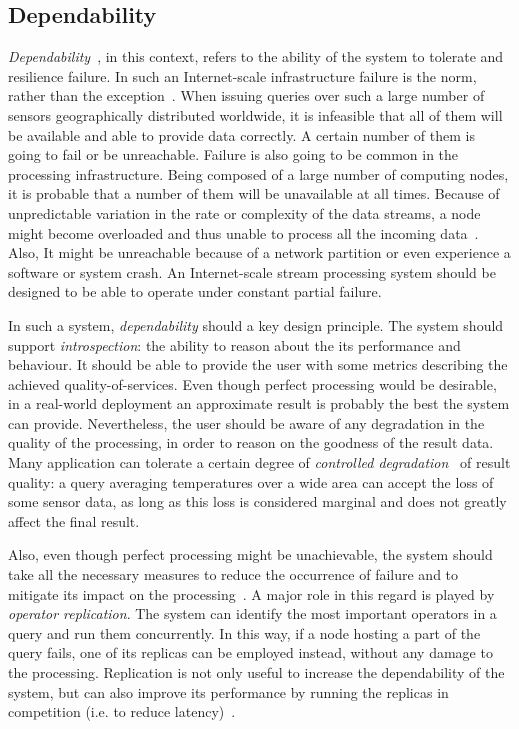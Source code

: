 \subsection{Dependability}
\emph{Dependability}~\cite{dependability}, in this context, refers to the ability of the system to tolerate and resilience failure.
In such an Internet-scale infrastructure failure is the norm, rather than the exception~\cite{correlated-failures,
failure-analysis}. When issuing queries over such a large number of sensors geographically distributed worldwide, it is infeasible that all of them will be available and
able to provide data correctly. A certain number of them is going to fail or be unreachable. Failure is also going to be
common in the processing infrastructure. Being composed of a large number of computing nodes, it is probable that a
number of them will be unavailable at all times. Because of unpredictable variation in the rate or complexity of the
data streams, a node might become overloaded and thus unable to process all the incoming data~\cite{dist-net-mon}. Also, It might be
unreachable because of a network partition or even experience a software or system crash. An Internet-scale 
stream processing system should be designed to be able to operate under constant partial failure. 

In such a system, \textit{dependability} should a key design principle. The system should support \emph{introspection}:
the ability to reason about the its performance and behaviour. It should be able to provide the user with some metrics
describing the achieved quality-of-services. Even though perfect processing would be desirable, in a real-world deployment an approximate result is
probably the best the system can provide. Nevertheless, the user should be aware of any degradation in the quality of
the processing, in order to reason on the goodness of the result data. Many application can tolerate a certain degree
of \emph{controlled degradation}~\cite{dissp-challanges} of result quality: a query averaging temperatures over a wide
area can accept the loss of some sensor data, as long as this loss is considered marginal and does not greatly affect
the final result.

Also, even though perfect processing might be unachievable, the system should take all the necessary measures to
reduce the occurrence of failure and to mitigate its impact on the processing~\cite{dependable-is-sensing,
borealis-fault_tolerance}. A major role in this regard is played by \emph{operator replication}. 
The system can identify the most important operators in a query and run them concurrently. In this way, if a node
hosting a part of the query fails, one of its replicas can be employed instead, without any damage to the processing.
Replication is not only useful to increase the dependability of the system, but can also improve its performance by
running the replicas in competition (i.e. to reduce latency)~\cite{borealis-fast_and_ha, borealis-fast_and_reliable}.


